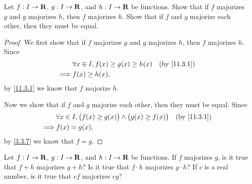 \exercisesection

\begin{exercise}\label{ex 11.3.1}
  Let \(f : I \to \mathbf{R}\), \(g : I \to \mathbf{R}\), and \(h : I \to \mathbf{R}\) be functions.
  Show that if \(f\) majorizes \(g\) and \(g\) majorizes \(h\), then \(f\) majorizes \(h\).
  Show that if \(f\) and \(g\) majorize each other, then they must be equal.
\end{exercise}

\begin{proof}
  We first show that if \(f\) majorizes \(g\) and \(g\) majorizes \(h\), then \(f\) majorizes \(h\).
  Since
  \begin{align*}
             & \forall x \in I, f(x) \geq g(x) \geq h(x) & \text{(by \cref{11.3.1})} \\
    \implies & f(x) \geq h(x),
  \end{align*}
  by \cref{11.3.1} we know that \(f\) majorize \(h\).

  Now we show that if \(f\) and \(g\) majorize each other, then they must be equal.
  Since
  \begin{align*}
             & \forall x \in I, \big(f(x) \geq g(x)\big) \land \big(g(x) \geq f(x)\big) & \text{(by \cref{11.3.1})} \\
    \implies & f(x) = g(x),
  \end{align*}
  by \cref{3.3.7} we know that \(f = g\).
\end{proof}

\begin{exercise}\label{ex 11.3.2}
  Let \(f : I \to \mathbf{R}\), \(g : I \to \mathbf{R}\), and \(h : I \to \mathbf{R}\) be functions.
  If \(f\) majorizes \(g\), is it true that \(f + h\) majorizes \(g + h\)?
  Is it true that \(f \cdot h\) majorizes \(g \cdot h\)?
  If \(c\) is a real number, is it true that \(cf\) majorizes \(cg\)?
\end{exercise}

